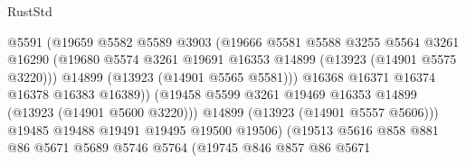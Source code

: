 \begin{lexlean}{RustStd}
\begin{coremodule}
                                      @5591
                                      (@19659
                                        @5582
                                        @5589
                                        @3903
                                        (@19666
                                          @5581
                                          @5588
                                          @3255
                                          @5564
                                          @3261
                                          @16290
                                          (@19680
                                            @5574
                                            @3261
                                            @19691
                                            @16353
                                            @14899
                                            (@13923 (@14901 @5575 @3220)))
                                          @14899
                                          (@13923 (@14901 @5565 @5581)))
                                        @16368
                                        @16371
                                        @16374
                                        @16378
                                        @16383
                                        @16389))
                                    (@19458
                                      @5599
                                      @3261
                                      @19469
                                      @16353
                                      @14899
                                      (@13923 (@14901 @5600 @3220)))
                                    @14899
                                    (@13923 (@14901 @5557 @5606)))
                                  @19485
                                  @19488
                                  @19491
                                  @19495
                                  @19500
                                  @19506)
                                (@19513
                                  @5616
                                  @858
                                  @881
                                  @86
                                  @5671
                                  @5689
                                  @5746
                                  @5764
                                  (@19745
                                    @846
                                    @857
                                    @86
                                    @5671

\end{coremodule}
\end{lexlean}
